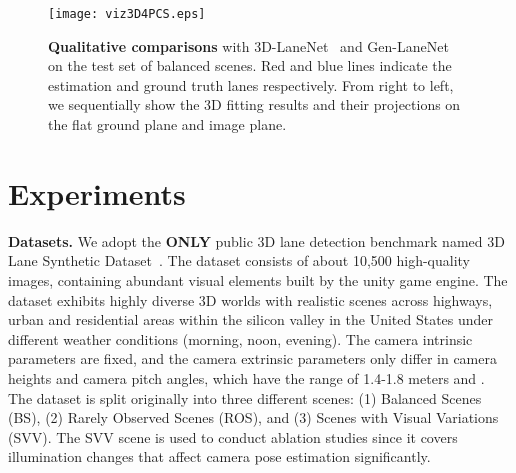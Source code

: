 \documentclass[letterpaper]{article} \usepackage{aaai22}  \usepackage{times}  \usepackage{helvet}  \usepackage{courier}  \usepackage[hyphens]{url}  \usepackage{graphicx} \urlstyle{rm} \def\UrlFont{\rm}  \usepackage{natbib}  \usepackage{caption}
\begin{document}
\begin{figure*}[t]
\begin{center}
\texttt{[image: viz3D4PCS.eps]}
\end{center}
\caption{\textbf{Qualitative comparisons} with 3D-LaneNet~\cite{3DLaneNet} and Gen-LaneNet~\cite{GenLaneNet} on the test set of balanced scenes. Red and blue lines indicate the estimation and ground truth lanes respectively. From right to left, we sequentially show the 3D fitting results and their projections on the flat ground plane and image plane.}
\label{fig:qual3dlane}
\end{figure*}


\begin{table}[t]
\begin{center}
\caption{Comparisons of resource consumption. The number of MACs and parameters (\#Para) are given in GHz and million. The PP means the requirement of post processing like outlier removal and non-maximum suppression.}
\label{tab:ResourceResult}
\end{center}
\vspace{-0.5em}
\end{table}


\section{Experiments}

\noindent \textbf{Datasets.}
We adopt the \textbf{ONLY} public 3D lane detection benchmark named 3D Lane Synthetic Dataset~\cite{GenLaneNet}. The dataset consists of about 10,500 high-quality  images, containing abundant visual elements built by the unity game engine.  The dataset exhibits highly diverse 3D worlds with realistic scenes across highways, urban and residential areas within the silicon valley in the United States under different weather conditions (morning, noon, evening). The camera intrinsic parameters are fixed, and the camera extrinsic parameters only differ in camera heights and camera pitch angles, which have the range of 1.4-1.8 meters and . The dataset is split originally into three different scenes: (1) Balanced Scenes (BS), (2) Rarely Observed Scenes (ROS), and (3) Scenes with Visual Variations (SVV). The SVV scene is used to conduct ablation studies since it covers illumination changes that affect camera pose estimation significantly.
\end{document}
